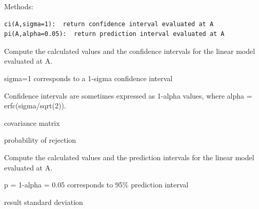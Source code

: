 \documentclass[letterpaper,10pt,english]{sphinxmanual}
\begin{document}
\begin{fulllineitems}
Methods:

\begin{Verbatim}[commandchars=@\[\]]
ci(A,sigma=1):  return confidence interval evaluated at A
pi(A,alpha=0.05):  return prediction interval evaluated at A
\end{Verbatim}

\begin{fulllineitems}
\label{api/wsolve:refl1d.wsolve.LinearModel.ci}
Compute the calculated values and the confidence intervals
for the linear model evaluated at A.

sigma=1 corresponds to a 1-sigma confidence interval

Confidence intervals are sometimes expressed as 1-alpha values,
where alpha = erfc(sigma/sqrt(2)).

\end{fulllineitems}


\begin{fulllineitems}
\label{api/wsolve:refl1d.wsolve.LinearModel.cov}
covariance matrix

\end{fulllineitems}


\begin{fulllineitems}
\label{api/wsolve:refl1d.wsolve.LinearModel.p}
probability of rejection

\end{fulllineitems}


\begin{fulllineitems}
\label{api/wsolve:refl1d.wsolve.LinearModel.pi}
Compute the calculated values and the prediction intervals
for the linear model evaluated at A.

p = 1-alpha = 0.05 corresponds to 95\% prediction interval

\end{fulllineitems}


\begin{fulllineitems}
\label{api/wsolve:refl1d.wsolve.LinearModel.std}
result standard deviation


\end{fulllineitems}
\end{fulllineitems}
\end{document}
